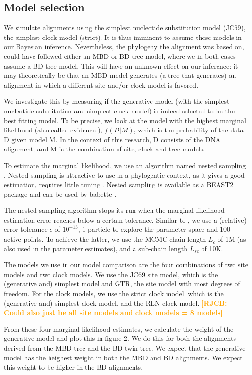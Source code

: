 \documentclass{article}
\newcommand*\richel[1]{\textcolor{orange}{\textbf{[RJCB: #1]}}}
\begin{document}
\begin{itemize}
\subsection{Model selection}

We simulate alignments using the simplest nucleotide substitution model (JC69),
the simplest clock model (strict). It is thus imminent to assume these
models in our Bayesian inference. Nevertheless, the phylogeny the alignment
was based on, could have followed either an MBD or BD tree model, 
where we in both cases assume a BD tree model. This will have 
an unknown effect on our inference: it may theoretically be that an MBD model
generates (a tree that generates) an alignment in which a different site 
and/or clock model is favored. 

We investigate this by measuring if the generative model (with the simplest
nucleotide substitution and simplest clock model) is indeed selected 
to be the best fitting model. 
To be precise, we look at the model 
with the highest marginal likelihood 
(also called evidence \cite{mackay2003information}),
$f(D|M)$, which is the probability of the data D given model M.
In the context of this research, D consists of the DNA alignment,
and M is the combination of site, clock and tree models.

To estimate the marginal likelihood, 
we use an algorithm named nested sampling \cite{skilling2006nested}.
Nested sampling is attractive to use
in a phylogentic context, as it gives a good estimation,
requires little tuning \cite{maturana2018}.
Nested sampling is available as a BEAST2 package
and can be used by babette \cite{babette}.

The nested sampling algorithm stops its run 
when the marginal likelihood estimation error 
reaches below a certain tolerance.  
Similar to \cite{maturana2018},
we use a (relative) error tolerance $\epsilon$ of $10^{-13}$,
1 particle to explore the parameter space
and 100 active points. 
To achieve the latter, we use the MCMC chain length $L_c$ of 1M 
(as also used in the parameter estimates),
and a sub-chain length $L_{sc}$ of 10K.

The models we use in our model comparison are the four combinations
of two site models and two clock models. We use the JC69 site model, which
is the (generative and) simplest model and GTR, the site model with most
degrees of freedom. For the clock models, we use the strict clock model,
which is the (generative and) simplest clock model, and the RLN clock model.
\richel{Could also just be all site models and clock models = 8 models}

From these four marginal likelihood estimates, we calculate the weight of
the generative model and plot this in figure 2. We do this for both the 
alignments derived from the MBD tree and the BD twin tree. We expect that
the generative model has the heighest weight in both the MBD and BD alignments.
We expect this weight to be higher in the BD alignments.

\end{itemize}
\end{document}

